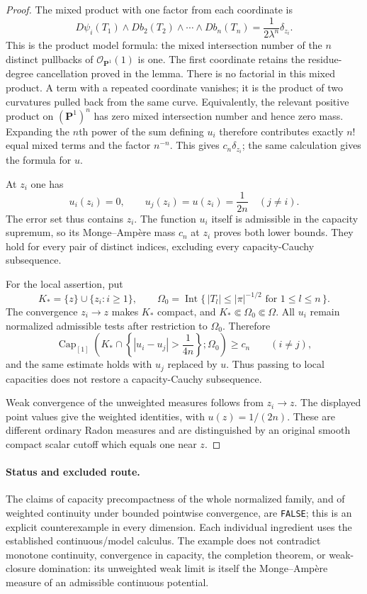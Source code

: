 \documentclass[11pt,a4paper]{article}
\numberwithin{equation}{section}
\theoremstyle{definition}
\theoremstyle{remark}
\begin{document}
\begin{proof}
The mixed product with one factor from each coordinate is
\[
 D\psi_i(T_1)\wedge Db_2(T_2)\wedge\cdots\wedge Db_n(T_n)
       =\frac1{2\lambda^n}\delta_{z_i}.
\]
This is the product model formula: the mixed intersection
number of the $n$ distinct pullbacks of
$\mathcal O_{\mathbf P^1}(1)$ is one. The first coordinate
retains the residue-degree cancellation proved in the lemma.
There is no factorial in this mixed product. A term with a
repeated coordinate vanishes; it is the product of two
curvatures pulled back from the same curve. Equivalently,
the relevant positive product on $(\mathbf P^1)^n$ has zero
mixed intersection number and hence zero mass.
Expanding the $n$th power of the sum defining $u_i$ therefore
contributes exactly $n!$ equal mixed terms and the factor
$n^{-n}$. This gives $c_n\delta_{z_i}$; the same calculation
gives the formula for $u$.

At $z_i$ one has
\[
 u_i(z_i)=0,\qquad
 u_j(z_i)=u(z_i)=\frac1{2n}\quad(j\ne i).
\]
The error set thus contains $z_i$. The function $u_i$ itself
is admissible in the capacity supremum, so its Monge--Amp\`ere
mass $c_n$ at $z_i$ proves both lower bounds. They hold for
every pair of distinct indices, excluding every
capacity-Cauchy subsequence.

For the local assertion, put
\[
 K_*=\{z\}\cup\{z_i:i\geq1\},\qquad
 \Omega_0=\operatorname{Int}
   \{\,|T_l|\leq|\pi|^{-1/2}\text{ for }1\leq l\leq n\,\}.
\]
The convergence $z_i\to z$ makes $K_*$ compact, and
$K_*\Subset\Omega_0\Subset\Omega$. All $u_i$ remain normalized
admissible tests after restriction to $\Omega_0$. Therefore
\[
 \operatorname{Cap}_{[1]}
  \left(K_*\cap\left\{|u_i-u_j|>\frac1{4n}\right\};\Omega_0\right)
       \geq c_n\qquad(i\ne j),
\]
and the same estimate holds with $u_j$ replaced by $u$.
Thus passing to local capacities does not restore a
capacity-Cauchy subsequence.

Weak convergence of the unweighted measures follows from
$z_i\to z$. The displayed point values give the weighted
identities, with $u(z)=1/(2n)$. These are different ordinary
Radon measures and are distinguished by an original smooth
compact scalar cutoff which equals one near $z$.
\end{proof}

\paragraph{Status and excluded route.}
The claims of capacity precompactness of the whole normalized
family, and of weighted continuity under bounded pointwise
convergence, are \texttt{FALSE}; this is an explicit
counterexample in every dimension. Each individual ingredient
uses the established continuous/model calculus. The example
does not contradict monotone continuity, convergence in
capacity, the completion theorem, or weak-closure domination:
its unweighted weak limit is itself the Monge--Amp\`ere measure
of an admissible continuous potential.
\end{document}
